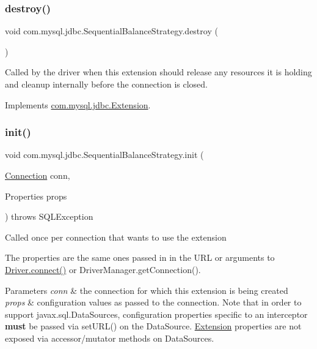 \subsubsection{\texorpdfstring{destroy()}{destroy()}}
{\footnotesize\ttfamily void com.\+mysql.\+jdbc.\+Sequential\+Balance\+Strategy.\+destroy (\begin{DoxyParamCaption}{ }\end{DoxyParamCaption})}

Called by the driver when this extension should release any resources it is holding and cleanup internally before the connection is closed. 

Implements \mbox{\hyperlink{interfacecom_1_1mysql_1_1jdbc_1_1_extension_a7d9644de305efed5df71f3fcc7cc1772}{com.\+mysql.\+jdbc.\+Extension}}.

\mbox{\label{classcom_1_1mysql_1_1jdbc_1_1_sequential_balance_strategy_af65fb561c63eee645ba22169ed2eaabb}} 
\subsubsection{\texorpdfstring{init()}{init()}}
{\footnotesize\ttfamily void com.\+mysql.\+jdbc.\+Sequential\+Balance\+Strategy.\+init (\begin{DoxyParamCaption}\item[{\mbox{\hyperlink{interfacecom_1_1mysql_1_1jdbc_1_1_connection}{Connection}}}]{conn,  }\item[{Properties}]{props }\end{DoxyParamCaption}) throws S\+Q\+L\+Exception}

Called once per connection that wants to use the extension

The properties are the same ones passed in in the U\+RL or arguments to \mbox{\hyperlink{classcom_1_1mysql_1_1jdbc_1_1_non_registering_driver_a834c012e752a01d1ee435b3461bb8218}{Driver.\+connect()}} or Driver\+Manager.\+get\+Connection().


\begin{DoxyParams}{Parameters}
{\em conn} & the connection for which this extension is being created \\
\hline
{\em props} & configuration values as passed to the connection. Note that in order to support javax.\+sql.\+Data\+Sources, configuration properties specific to an interceptor {\bfseries must} be passed via set\+U\+R\+L() on the Data\+Source. \mbox{\hyperlink{interfacecom_1_1mysql_1_1jdbc_1_1_extension}{Extension}} properties are not exposed via accessor/mutator methods on Data\+Sources.\\
\hline
\end{DoxyParams}

